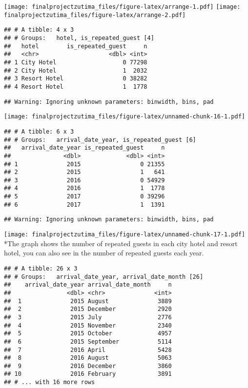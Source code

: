 \documentclass[
]{article}
\begin{document}
\texttt{[image: finalprojectzutima\_files/figure-latex/arrange-1.pdf]}
\texttt{[image: finalprojectzutima\_files/figure-latex/arrange-2.pdf]}

\begin{verbatim}
## # A tibble: 4 x 3
## # Groups:   hotel, is_repeated_guest [4]
##   hotel        is_repeated_guest     n
##   <chr>                    <dbl> <int>
## 1 City Hotel                   0 77298
## 2 City Hotel                   1  2032
## 3 Resort Hotel                 0 38282
## 4 Resort Hotel                 1  1778
\end{verbatim}

\begin{verbatim}
## Warning: Ignoring unknown parameters: binwidth, bins, pad
\end{verbatim}

\texttt{[image: finalprojectzutima\_files/figure-latex/unnamed-chunk-16-1.pdf]}

\begin{verbatim}
## # A tibble: 6 x 3
## # Groups:   arrival_date_year, is_repeated_guest [6]
##   arrival_date_year is_repeated_guest     n
##               <dbl>             <dbl> <int>
## 1              2015                 0 21355
## 2              2015                 1   641
## 3              2016                 0 54929
## 4              2016                 1  1778
## 5              2017                 0 39296
## 6              2017                 1  1391
\end{verbatim}

\begin{verbatim}
## Warning: Ignoring unknown parameters: binwidth, bins, pad
\end{verbatim}

\texttt{[image: finalprojectzutima\_files/figure-latex/unnamed-chunk-17-1.pdf]}
*The graph shows the number of repeated guests in each city hotel and
resort hotel, you can also see in the number of repeated guests each
year.

\begin{verbatim}
## # A tibble: 26 x 3
## # Groups:   arrival_date_year, arrival_date_month [26]
##    arrival_date_year arrival_date_month     n
##                <dbl> <chr>              <int>
##  1              2015 August              3889
##  2              2015 December            2920
##  3              2015 July                2776
##  4              2015 November            2340
##  5              2015 October             4957
##  6              2015 September           5114
##  7              2016 April               5428
##  8              2016 August              5063
##  9              2016 December            3860
## 10              2016 February            3891
## # ... with 16 more rows
\end{verbatim}
\end{document}
